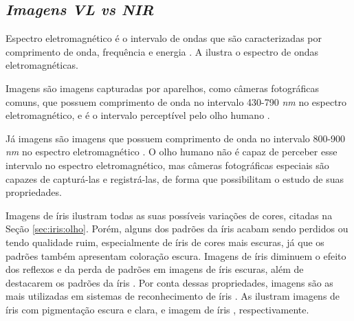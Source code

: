 \subsection{\textit{Imagens \acrfull{VL} vs \acrfull{NIR}}}

\par Espectro eletromagnético é o intervalo de ondas que são caracterizadas por comprimento de onda, frequência e energia \cite{gonsalez2006}. A  ilustra o espectro de ondas eletromagnéticas.

%

Imagens \textit{} são imagens capturadas por aparelhos, como câmeras fotográficas comuns, que possuem comprimento de onda no intervalo 430-790 \textit{nm} no espectro eletromagnético, e é o intervalo perceptível pelo olho humano \cite{gonsalez2006}.

\par Já imagens  são imagens que possuem comprimento de onda no intervalo 800-900 \textit{nm} no espectro eletromagnético \cite{gonsalez2006}. O olho humano não é capaz de perceber esse intervalo no espectro eletromagnético, mas câmeras fotográficas especiais são capazes de capturá-las e registrá-las, de forma que possibilitam o estudo de suas propriedades\cite{nir}.


\par Imagens \textit{} de íris ilustram todas as suas possíveis variações de cores, citadas na Seção \ref{sec:iris:olho}. Porém, alguns dos padrões da íris acabam sendo perdidos ou tendo qualidade ruim, especialmente de íris de cores mais escuras, já que os padrões também apresentam coloração escura. Imagens de íris  diminuem o efeito dos reflexos e da perda de padrões em imagens de íris escuras, além de destacarem os padrões da íris \cite{abdullah2015}. Por conta dessas propriedades, imagens  são as mais utilizadas em sistemas de reconhecimento de íris \cite{daugman2004}. As  ilustram imagens de íris \textit{} com pigmentação escura e clara, e imagem de íris \textit{}, respectivamente.


